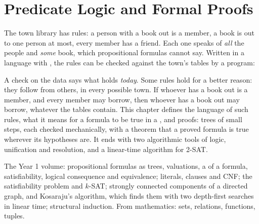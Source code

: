 \chapter{Predicate Logic and Formal Proofs}\label{ch:b2:predicate-logic}

The town library has rules: a person with a book out is a member, a book is out to one person at most, every member
has a friend. Each one speaks of \emph{all} the people and \emph{some} book, which propositional formulas
cannot say. Written in a language with , the rules can be checked against the town's tables by a program:

\label{lst:b2:predicate-logic:evaluate}

\label{out:b2:predicate-logic:evaluate}

A check on the data says what holds \emph{today}. Some rules hold for a better reason: they follow from others, in
every possible town. If whoever has a book out is a member, and every member may borrow, then whoever has a book out
may borrow, whatever the tables contain. This chapter defines the language of such rules, what it means for a formula
to be true in a , and proofs: trees of small steps, each checked mechanically, with a theorem that a proved
formula is true wherever its hypotheses are. It ends with two algorithmic tools of logic, unification and resolution,
and a linear-time algorithm for 2-SAT.

\begin{recall}
The Year 1 volume: propositional formulas as trees, valuations, a  of a formula, satisfiability, logical
consequence and equivalence; literals, clauses and CNF; the satisfiability problem and $k$-SAT; strongly connected
components of a directed graph, and Kosaraju's algorithm, which finds them with two depth-first searches in linear time;
structural induction. From mathematics: sets, relations, functions, tuples.
\end{recall}

